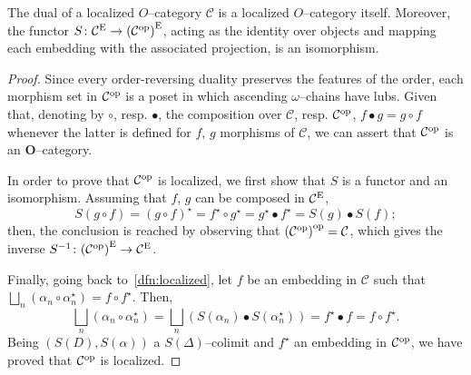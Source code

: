 \begin{prp}\label{iso:dual}
  The dual of a localized \(O\)--category \(\mathcal{C}\) is a localized \(O\)--category itself.
  Moreover, the functor
  \(
    S \colon \mathcal{C}^\textup{E} \to {(\mathcal{C}^\textup{op})}^\textup{E}
  \),
  acting as the identity over objects and mapping each embedding with the associated projection, is an isomorphism.
\end{prp}
\begin{proof}
  Since every order-reversing duality preserves the features of the order, each morphism set in \(\mathcal{C}^\textup{op}\) is a poset in which ascending \(\omega\)--chains have lubs. %
  Given that, denoting by \(\circ\), resp. \(\bullet\), the composition over \(\mathcal{C}\), resp. \(\mathcal{C}^\textup{op}\), \(f \bullet g = g \circ f\) whenever the latter is defined for \(f\), \(g\) morphisms of \(\mathcal{C}\), we can assert that \(\mathcal{C}^\textup{op}\) is an \(\mathbf{O}\)--category. %

  In order to prove that \(\mathcal{C}^\textup{op}\) is localized, we first show that \(S\) is a functor and an isomorphism. Assuming that \(f\), \(g\) can be composed in \(\mathcal{C}^\textup{E}\),
  \begin{equation*}
    S(g \circ f) = {(g \circ f)}^\star = f^\star \circ g^\star = g^\star \bullet f^\star = S(g) \bullet S(f);
  \end{equation*}
  then, the conclusion is reached by observing that \({(\mathcal{C}^\textup{op})}^\textup{op} = \mathcal{C}\), which gives the inverse \(S^{-1} \colon {(\mathcal{C}^\textup{op})}^\textup{E} \to \mathcal{C}^\textup{E}\).

  Finally, going back to~\ref{dfn:localized}, let \(f\) be an embedding in \(\mathcal{C}\) such that \(\bigsqcup_n(\alpha_n \circ \alpha_n^\star) = f \circ f^\star\). Then, %
  \begin{equation*}
    \bigsqcup_n(\alpha_n \circ \alpha_n^\star) =
    \bigsqcup_n(S(\alpha_n) \bullet S(\alpha_n^\star)) =
    f^\star \bullet f = f \circ f^\star.
  \end{equation*}
  Being \((S(D),S(\alpha))\) a \(S(\Delta)\)--colimit and \(f^\star\) an embedding in \(\mathcal{C}^\textup{op}\), we have proved that \(\mathcal{C}^\textup{op}\) is localized. \qedhere %
\end{proof}

